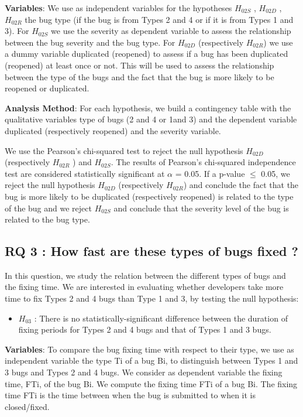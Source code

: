 {\bf Variables}: We use as independent variables for the
hypotheses $H_{02S}$ , $H_{02D}$ , $H_{02R}$ the bug type (if the bug is from
Types 2 and 4 or if it is from Types 1 and 3). For $H_{02S}$  we use
the severity as dependent variable to assess the relationship
between the bug severity and the bug type. For $H_{02D}$
(respectively $H_{02R}$) we use a dummy variable duplicated
(reopened) to assess if a bug has been duplicated (reopened)
at least once or not. This will be used to assess the
relationship between the type of the bugs and the fact that the
bug is more likely to be reopened or duplicated.

{\bf Analysis Method}: For each hypothesis, we build a
contingency table with the qualitative variables type of bugs
(2 and 4 or 1and 3) and the dependent variable duplicated
(respectively reopened) and the severity variable.

We use the Pearson’s chi-squared test to reject the null
hypothesis $H_{02D}$ (respectively $H_{02R}$ ) and $H_{02S}$. The results of
Pearson’s chi-squared independence test are considered
statistically significant at $\alpha$ = 0.05. If a p-value $\le$ 0.05, we
reject the null hypothesis  $H_{02D}$ (respectively $H_{02R}$) and
conclude the fact that the bug is more likely to be duplicated
(respectively reopened) is related to the type of the bug and
we reject $H_{02S}$ and conclude that the severity level of the bug
is related to the bug type.

\subsection{RQ 3 : How fast are these types of bugs fixed ?}

In this question, we study the relation between the
different types of bugs and the fixing time. We are interested
in evaluating whether developers take more time to fix Types
2 and 4 bugs than Type 1 and 3, by testing the null hypothesis:

\begin{itemize}
	\item $H_{03}$ : There is no statistically-significant difference
between the duration of fixing periods for Types 2 and
4 bugs and that of Types 1 and 3 bugs.
\end{itemize}


{\bf Variables}: To compare the bug fixing time with respect to
their type, we use as independent variable the type Ti of a
bug Bi, to distinguish between Types 1 and 3 bugs and Types
2 and 4 bugs. We consider as dependent variable the fixing
time, FTi, of the bug Bi. We compute the fixing time FTi of a
bug Bi. The fixing time FTi is the time between when the bug
is submitted to when it is closed/fixed.

